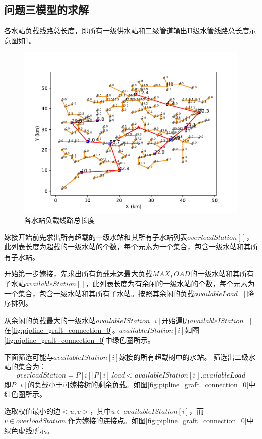 \documentclass{cumcmthesis}
\begin{document}
\subsection{问题三模型的求解}
  各水站负载线路总长度，即所有一级供水站和二级管道输出II级水管线路总长度示意图如\cref{fig:pipline_length}。
  \begin{figure}[!h]
    \centering
    \includegraphics[width=.8\textwidth]{figure/pipline_length.pdf}
    \caption{各水站负载线路总长度}
    \label{fig:pipline_length}
  \end{figure}
  嫁接开始前先求出所有超载的一级水站和其所有子水站列表$overloadStation[]$，此列表长度为超载的一级水站的个数，每个元素为一个集合，包含一级水站和其所有子水站。

  开始第一步嫁接，先求出所有负载未达最大负载$MAX_LOAD$的一级水站和其所有子水站$availableStation[]$，此列表长度为有余闲的一级水站的个数，每个元素为一个集合，包含一级水站和其所有子水站。按照其余闲的负载$availableLoad[]$降序排列。
  
  从余闲的负载最大的一级水站$availableIStation[i]$开始遍历$availableIStation[]$在\cref{fig:pipline_graft_connection_0}。$availableIStation[i]$如图\cref{fig:pipline_graft_connection_0}中绿色圈所示。
  
  下面筛选可能与$availableIStation[i]$嫁接的所有超载树中的水站。
  筛选出二级水站的集合为：
  $$overloadStation={P[i] |P[i].load < availableIStation[i].availableLoad }$$
  即$P[i]$的负载小于可嫁接树的剩余负载。如图\cref{fig:pipline_graft_connection_0}中红色圈所示。

  选取权值最小的边$<u, v>$，其中$u \in availableIStation[i]$，而$v \in overloadStation$
  作为嫁接的连接点。如图\cref{fig:pipline_graft_connection_0}中绿色虚线所示。
\end{document}
